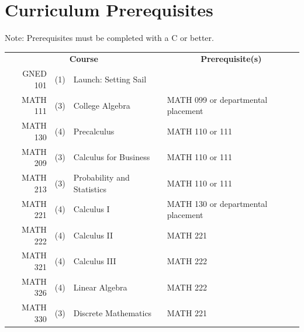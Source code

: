 \section{Curriculum Prerequisites}
\begin{center}Note: Prerequisites must be completed with a C or better.\end{center}
\setlength{\tabcolsep}{5pt}
\setlength{\arrayrulewidth}{1px}

\begin{reqgroup}[left*=1pt,right*=1pt,bottom=0pt]{}
\centering\small
{}
\begin{tabularx}{\textwidth}{ r c l  | X }
\multicolumn{3}{c}{\normalsize\textbf{Course}} & \multicolumn{1}{c}{\normalsize\textbf{Prerequisite(s)}}\\
\arrayrulecolor{csugold}\hline
	GNED 101 & (1) & Launch: Setting Sail & \\

	MATH 111 & (3) & College Algebra & MATH 099 or departmental placement \\
	MATH 130 & (4) & Precalculus & MATH 110 or 111 \\
	MATH 209 & (3) & Calculus for Business & MATH 110 or 111 \\
	MATH 213 & (3) & Probability and Statistics & MATH 110 or 111 \\
	MATH 221 & (4) & Calculus I & MATH 130 or departmental placement \\
	MATH 222 & (4) & Calculus II & MATH 221 \\
	MATH 321 & (4) & Calculus III & MATH 222 \\
	MATH 326 & (4) & Linear Algebra & MATH 222 \\
	MATH 330 & (3) & Discrete Mathematics & MATH 221  \\


\end{tabularx}
\end{reqgroup}
